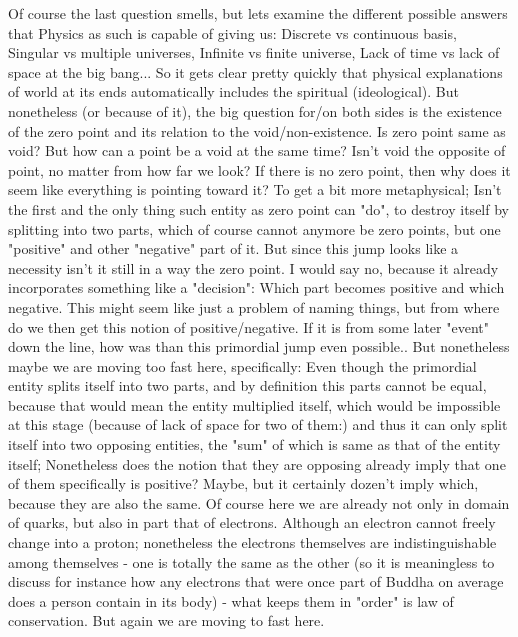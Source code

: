 \documentclass{book}
\begin{document}
Of course the last question smells, but lets examine the different possible answers that Physics as such is capable of giving us: Discrete vs continuous basis, Singular vs multiple universes, Infinite vs finite universe, Lack of time vs lack of space at the big bang... So it gets clear pretty quickly that physical explanations of world at its ends automatically includes the spiritual (ideological).
But nonetheless (or because of it), the big question for/on both sides is the existence of the zero point and its relation to the void/non-existence. Is zero point same as void? But how can a point be a void at the same time? Isn't void the opposite of point, no matter from how far we look? If there is no zero point, then why does it seem like everything is pointing toward it?
To get a bit more metaphysical; Isn't the first and the only thing such entity as zero point can "do", to destroy itself by splitting into two parts, which of course cannot anymore be zero points, but one "positive" and other "negative" part of it. But since this jump looks like a necessity isn't it still in a way the zero point. I would say no, because it already incorporates something like a "decision": Which part becomes positive and which negative. This might seem like just a problem of naming things, but from where do we then get this notion of positive/negative. If it is from some later "event" down the line, how was than this primordial jump even possible.. But nonetheless maybe we are moving too fast here, specifically: Even though the primordial entity splits itself into two parts, and by definition this parts cannot be equal, because that would mean the entity multiplied itself, which would be impossible at this stage (because of lack of space for two of them:) and thus it can only split itself into two opposing entities, the "sum" of which is same as that of the entity itself; Nonetheless does the notion that they are opposing already imply that one of them specifically is positive? Maybe, but it certainly dozen't imply which, because they are also the same. Of course here we are already not only in domain of quarks, but also in part that of electrons. Although an electron cannot freely change into a proton; nonetheless the electrons themselves are indistinguishable among themselves - one is totally the same as the other (so it is meaningless to discuss for instance how any electrons that were once part of Buddha on average does a person contain in its body) - what keeps them in "order" is law of conservation. But again we are moving to fast here. 
\end{document}
